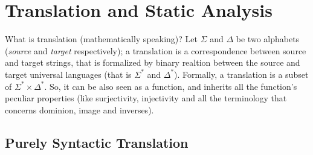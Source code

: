 \chapter{Translation and Static Analysis}
	What is translation (mathematically speaking)? Let $\Sigma$ and $\Delta$ be two alphabets (\emph{source} and \emph{target} respectively); a translation is a correspondence between source and target strings, that is formalized by binary realtion between the source and target universal languages (that is $\Sigma^\ast$ and $\Delta^\ast$). Formally, a translation is a subset of $\Sigma^\ast \times \Delta^\ast$. So, it can be also seen as a function, and inherits all the function's peculiar properties (like surjectivity, injectivity and all the terminology that concerns dominion, image and inverses).
	
	\section{Purely Syntactic Translation}
